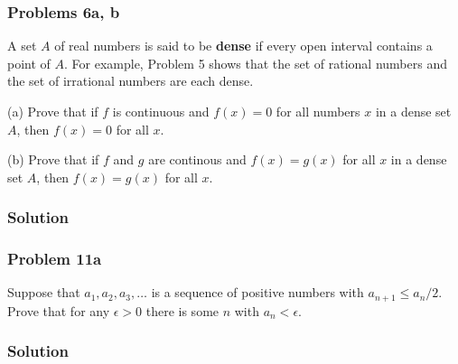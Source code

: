 \subsubsection*{Problems 6a, b}
A set $A$ of real numbers is said to be \textbf{dense} if every open
interval contains a point of $A$. For example, Problem 5 shows that
the set of rational numbers and the set of irrational numbers are each
dense.

\vs

(a) Prove that if $f$ is continuous and $f(x)=0$ for all numbers $x$
in a dense set $A$, then $f(x)=0$ for all $x$.

\vs

(b) Prove that if $f$ and $g$ are continous and $f(x)=g(x)$ for all
$x$ in a dense set $A$, then $f(x)=g(x)$ for all $x$.

\subsubsection*{Solution}

\subsubsection*{Problem 11a}
Suppose that $a_{1}, a_{2}, a_{3}, \ldots$ is a sequence of positive
numbers with $a_{n+1}\leq a_{n}/2$. Prove that for any $\epsilon>0$ there is
some $n$ with $a_{n}<\epsilon$.

\subsubsection*{Solution}


